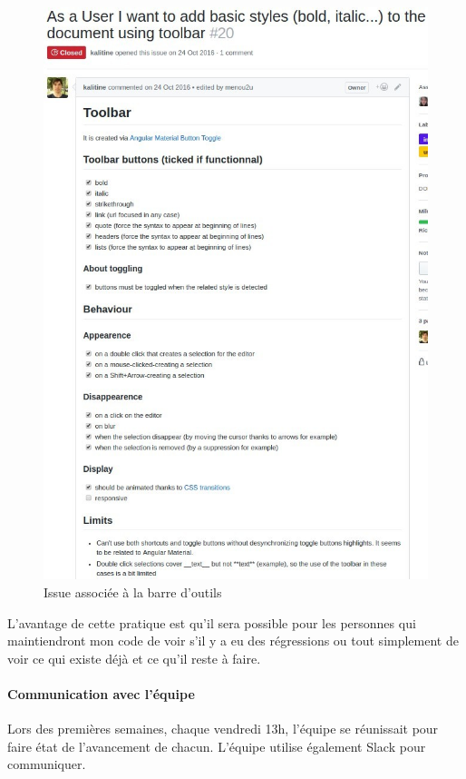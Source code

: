 \documentclass[12pt]{article}
\begin{document}
\newpage
\begin{figure}[H]
\centering
\includegraphics[scale=0.75]{gallery/issue.jpg}
\caption[nom dans le sommaire]{Issue associée à la barre d'outils}
\label{fig:gallery2}
\end{figure}
\newpage
L'avantage de cette pratique est qu'il sera possible pour les personnes qui maintiendront mon code de voir s'il y a eu des régressions ou tout simplement de voir ce qui existe déjà et ce qu'il reste à faire.\\

\paragraph{Communication avec l'équipe}
Lors des premières semaines, chaque vendredi 13h, l'équipe se réunissait pour faire état de l'avancement de chacun.
L'équipe utilise également Slack \cite{slack} pour communiquer.\\
\end{document}
